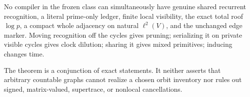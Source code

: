 \begin{corollary}\label{cor:compiler}
No compiler in the frozen class can simultaneously have genuine shared
recurrent recognition, a literal prime-only ledger, finite local visibility,
the exact total roof $\log p$, a compact whole adjacency on natural
$\ell^2(V)$, and the unchanged edge marker.  Moving recognition off the
cycles gives pruning; serializing it on private visible cycles gives clock
dilution; sharing it gives mixed primitives; inducing changes time.
\end{corollary}

The theorem is a conjunction of exact statements.  It neither asserts that
arbitrary countable graphs cannot realize a chosen orbit inventory nor rules
out signed, matrix-valued, supertrace, or nonlocal cancellations.
